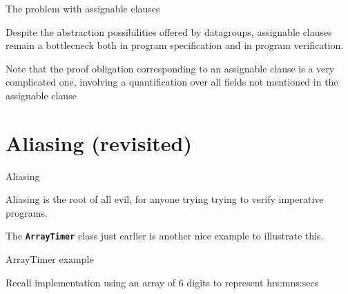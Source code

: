 \documentclass[
pdf,
nocolorBG,
slideColor,
erik,
]{prosper}
\newcommand{\code}[1]{{\rm \texttt{\textbf{\small #1}}}}
\begin{document}
\begin{slide}{The problem with assignable clauses}
\vspace*{-3ex}

Despite the abstraction possibilities offered by datagroups,
assignable clauses remain a bottlecneck both in program specification
and in program verification.

\medskip

{\scriptsize\rm Note that the proof obligation corresponding to an assignable
clause is a very complicated one, involving a quantification
over all fields not mentioned in the assignable clause}

\end{slide}



\part{{\Large \red Aliasing (revisited)}}

\begin{slide}{Aliasing}
\vspace*{-3ex}

Aliasing is the root of all evil, for anyone trying trying to verify 
imperative programs.

\medskip

The \code{ArrayTimer} class just earlier is another nice example
to illustrate this.

\end{slide}


\begin{slide}{ArrayTimer example}
\vspace*{-4ex}

Recall implementation using an array of 6 digits to represent
hrs:mns:secs


\end{slide}
\end{document}
